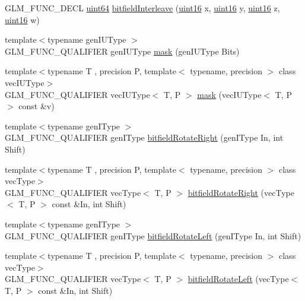 \begin{DoxyCompactItemize}
\item 
G\+L\+M\+\_\+\+F\+U\+N\+C\+\_\+\+D\+E\+C\+L \hyperlink{group__gtc__type__precision_gae3632bf9b37da66233d78930dd06378a}{uint64} \hyperlink{group__gtc__bitfield_gac8a926a7bfd9b23c22a4f685193fbfe1}{bitfield\+Interleave} (\hyperlink{group__gtc__type__precision_gad8c2939e1fdd8e5828b31d95c52255d5}{uint16} x, \hyperlink{group__gtc__type__precision_gad8c2939e1fdd8e5828b31d95c52255d5}{uint16} y, \hyperlink{group__gtc__type__precision_gad8c2939e1fdd8e5828b31d95c52255d5}{uint16} z, \hyperlink{group__gtc__type__precision_gad8c2939e1fdd8e5828b31d95c52255d5}{uint16} w)
\item 
{\footnotesize template$<$typename gen\+I\+U\+Type $>$ }\\G\+L\+M\+\_\+\+F\+U\+N\+C\+\_\+\+Q\+U\+A\+L\+I\+F\+I\+E\+R gen\+I\+U\+Type \hyperlink{group__gtc__bitfield_gad7eba518a0b71662114571ee76939f8a}{mask} (gen\+I\+U\+Type Bits)
\item 
{\footnotesize template$<$typename T , precision P, template$<$ typename, precision $>$ class vec\+I\+U\+Type$>$ }\\G\+L\+M\+\_\+\+F\+U\+N\+C\+\_\+\+Q\+U\+A\+L\+I\+F\+I\+E\+R vec\+I\+U\+Type$<$ T, P $>$ \hyperlink{group__gtc__bitfield_ga073dbd8642f550b51da3572541431c1c}{mask} (vec\+I\+U\+Type$<$ T, P $>$ const \&v)
\item 
{\footnotesize template$<$typename gen\+I\+Type $>$ }\\G\+L\+M\+\_\+\+F\+U\+N\+C\+\_\+\+Q\+U\+A\+L\+I\+F\+I\+E\+R gen\+I\+Type \hyperlink{namespaceglm_a29f065281c52cf3ca7695e71504687fc}{bitfield\+Rotate\+Right} (gen\+I\+Type In, int Shift)
\item 
{\footnotesize template$<$typename T , precision P, template$<$ typename, precision $>$ class vec\+Type$>$ }\\G\+L\+M\+\_\+\+F\+U\+N\+C\+\_\+\+Q\+U\+A\+L\+I\+F\+I\+E\+R vec\+Type$<$ T, P $>$ \hyperlink{group__gtc__bitfield_ga96b56fd2adad1eeaee9e10dfe83904ba}{bitfield\+Rotate\+Right} (vec\+Type$<$ T, P $>$ const \&In, int Shift)
\item 
{\footnotesize template$<$typename gen\+I\+Type $>$ }\\G\+L\+M\+\_\+\+F\+U\+N\+C\+\_\+\+Q\+U\+A\+L\+I\+F\+I\+E\+R gen\+I\+Type \hyperlink{namespaceglm_ae088d9983f8cb8fcf0aacae4ae51462a}{bitfield\+Rotate\+Left} (gen\+I\+Type In, int Shift)
\item 
{\footnotesize template$<$typename T , precision P, template$<$ typename, precision $>$ class vec\+Type$>$ }\\G\+L\+M\+\_\+\+F\+U\+N\+C\+\_\+\+Q\+U\+A\+L\+I\+F\+I\+E\+R vec\+Type$<$ T, P $>$ \hyperlink{group__gtc__bitfield_ga410d130917d85b865718e3ebc32cf0ef}{bitfield\+Rotate\+Left} (vec\+Type$<$ T, P $>$ const \&In, int Shift)

\end{DoxyCompactItemize}
